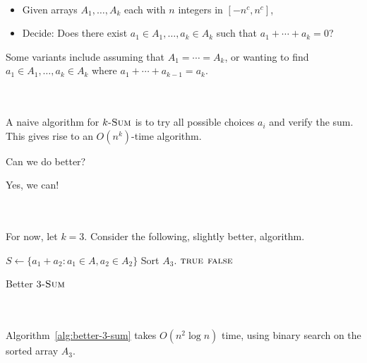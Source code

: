         \begin{compprob} \label{prob:ksum}
            \vphantom
            \\
            \begin{itemize}
                \item Given arrays \(A_1,\ldots,A_k\) each with \(n\) integers in \([-n^c,n^c]\),
                \item Decide: Does there exist \(a_1\in A_1,\ldots, a_k\in A_k\) such that \(a_1+\cdots+a_k=0\)?
            \end{itemize}
            Some variants include assuming that \(A_1=\cdots=A_k\), or wanting to find \(a_1\in A_1,\ldots, a_k\in A_k\) where \(a_1+\cdots+a_{k-1}=a_k\).
        \end{compprob}
        \vphantom
        \\
        \\
        A naive algorithm for \(k\textsc{-Sum}\) is to try all possible choices \(a_i\) and verify the sum. This gives rise to an \(O(n^k)\)-time algorithm.
        \begin{question*}
            Can we do better?
        \end{question*}
        \begin{answer*}
            Yes, we can!
        \end{answer*} 
        \vphantom
        \\
        \\
        For now, let \(k=3\). Consider the following, slightly better, algorithm.
        \begin{algorithm}[H] 
            \begin{algorithmic}[1]
                    \State \(S\gets \{a_1+a_2:a_1\in A,a_2\in A_2\}\) 
                    \State Sort \(A_3\). 
                     
                         \Return \(\textsc{true}\) 
                        \EndIf
                    \EndFor
                    \State \Return \(\textsc{false}\)
                \EndProcedure 
            \end{algorithmic}
            \caption{Better \(3\textsc{-Sum}\)}
            \label{alg:better-3-sum}
        \end{algorithm}
        \vphantom
        \\
        \\
        Algorithm~\ref{alg:better-3-sum} takes \(O(n^2\log n)\) time, using binary search on the sorted array \(A_3\).
